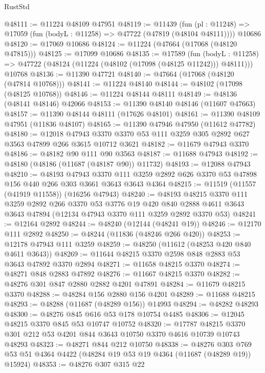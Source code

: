 \begin{lexlean}{RustStd}
\begin{coremodule}
@48111 := @11224 @48109 @47951
@48119 := @11439
    (fun (pl : @11248) => @17059 (fun (bodyL : @11258) => @47722 (@47819 (@48104 @48111))))
    @10686
@48120 := @17069 @10686
@48124 := @11224 (@47664 (@17068 (@48120 @47815)))
@48125 := @17099 @10686
@48135 := @17589
    (fun (bodyL : @11258) => @47722 (@48124 (@11224 (@48102 (@17098 (@48125 @11242))) @48111)))
    @10768
@48136 := @11390 @47721
@48140 := @47664 (@17068 (@48120 (@47814 @10768)))
@48141 := @11224 @48140
@48144 := @48102 (@17098 (@48125 @10768))
@48146 := @11224 @48144 @48111
@48149 := @48136 (@48141 @48146) @42066
@48153 := @11390 @48140 @48146 (@11607 @47663)
@48157 := @11390 @48144 @48111 (@17626 @48101)
@48161 := @11390 @48109 @47951 (@11836 @48107)
@48165 := @11390 @47946 @47950 (@11612 @47782)
@48180 := @12018
    @47943
    @3370
    @3370
    @53
    @111
    @3259
    @305
    @2892
    @627
    @3563
    @47899
    @266
    @3615
    @10712
    @3621
@48182 := @11679 @47943 @3370
@48186 := @48182 @90 @111 @90 @3563
@48187 := @11688 @47943
@48192 := @48180 (@48186 (@11687 (@48187 @90)) @11732)
@48193 := @12088 @47943
@48210 := @48193
    @47943
    @3370
    @111
    @3259
    @2892
    @626
    @3370
    @53
    @47898
    @156
    @440
    @266
    @303
    @3661
    @3643
    @3643
    @4364
@48215 := @11519 (@11557 (@41919 @11558)) (@16256 @47943)
@48240 := @48193
    @48215
    @3370
    @111
    @3259
    @2892
    @266
    @3370
    @53
    @3776
    @19
    @420
    @840
    @2888
    @4611
    @3643
    @3643
    @47894
    (@12134 @47943 @3370 @111 @3259 @2892 @3370 @53)
@48241 := @12164 @2892
@48244 := @48240 (@12144 (@48241 @19))
@48246 := @12170 @111 @2892
@48250 := @48244 (@11836 (@48246 @266 @420))
@48253 := @12178 @47943 @111 @3259
@48259 := @48250 (@11612 (@48253 @420 @840 @4611 @3643))
@48269 := @11644 @48215 @3370 @2598 @848 @2883 @53 @3643 @47892 @3370 @2894
@48271 := @11658 @48215 @3370
@48274 := @48271 @848 @2883 @47892
@48276 := @11667 @48215 @3370
@48282 := @48276 @301 @847 @2880 @2882 @4201 @47891
@48284 := @11679 @48215 @3370
@48288 := @48284 @156 @2880 @156 @4201
@48289 := @11688 @48215
@48293 := @48288 (@11687 (@48289 @156)) @14993
@48294 := @48282 @48293
@48300 := @48276 @845 @616 @53 @178 @10754 @4485
@48306 := @12045 @48215 @3370 @845 @53 @10747 @10752
@48320 := @17787 @48215 @3370 @301 @212 @53 @4201 @844 @3643 @10750 @3370 @4616 @10739 @10743 @48293
@48323 := @48271 @844 @212 @10750
@48338 := @48276
    @303
    @769
    @53
    @51
    @4364
    @4422
    (@48284 @19 @53 @19 @4364 (@11687 (@48289 @19)) @15924)
@48353 := @48276
    @307
    @315
    @22

\end{coremodule}
\end{lexlean}
